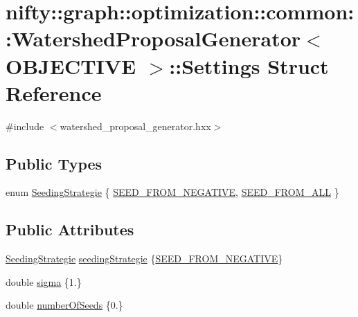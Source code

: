 \hypertarget{structnifty_1_1graph_1_1optimization_1_1common_1_1WatershedProposalGenerator_1_1Settings}{}\section{nifty\+:\+:graph\+:\+:optimization\+:\+:common\+:\+:Watershed\+Proposal\+Generator$<$ O\+B\+J\+E\+C\+T\+I\+V\+E $>$\+:\+:Settings Struct Reference}
\label{structnifty_1_1graph_1_1optimization_1_1common_1_1WatershedProposalGenerator_1_1Settings}


{\ttfamily \#include $<$watershed\+\_\+proposal\+\_\+generator.\+hxx$>$}

\subsection*{Public Types}
\begin{DoxyCompactItemize}
\item 
enum \hyperlink{structnifty_1_1graph_1_1optimization_1_1common_1_1WatershedProposalGenerator_1_1Settings_ac23797b007dcba802d2de1f5219eb4fa}{Seeding\+Strategie} \{ \hyperlink{structnifty_1_1graph_1_1optimization_1_1common_1_1WatershedProposalGenerator_1_1Settings_ac23797b007dcba802d2de1f5219eb4faace3f2f98878e7603a3ee96c8f5545149}{S\+E\+E\+D\+\_\+\+F\+R\+O\+M\+\_\+\+N\+E\+G\+A\+T\+I\+V\+E}, 
\hyperlink{structnifty_1_1graph_1_1optimization_1_1common_1_1WatershedProposalGenerator_1_1Settings_ac23797b007dcba802d2de1f5219eb4faab98c24bd25c4635bfa7aa0b19c3a401e}{S\+E\+E\+D\+\_\+\+F\+R\+O\+M\+\_\+\+A\+L\+L}
 \}
\end{DoxyCompactItemize}
\subsection*{Public Attributes}
\begin{DoxyCompactItemize}
\item 
\hyperlink{structnifty_1_1graph_1_1optimization_1_1common_1_1WatershedProposalGenerator_1_1Settings_ac23797b007dcba802d2de1f5219eb4fa}{Seeding\+Strategie} \hyperlink{structnifty_1_1graph_1_1optimization_1_1common_1_1WatershedProposalGenerator_1_1Settings_a9c4db55b498ef7326e415fbfadefd8d6}{seeding\+Strategie} \{\hyperlink{structnifty_1_1graph_1_1optimization_1_1common_1_1WatershedProposalGenerator_1_1Settings_ac23797b007dcba802d2de1f5219eb4faace3f2f98878e7603a3ee96c8f5545149}{S\+E\+E\+D\+\_\+\+F\+R\+O\+M\+\_\+\+N\+E\+G\+A\+T\+I\+V\+E}\}
\item 
double \hyperlink{structnifty_1_1graph_1_1optimization_1_1common_1_1WatershedProposalGenerator_1_1Settings_a979e41cf56d9e77b041418a432ec3a98}{sigma} \{1.\}
\item 
double \hyperlink{structnifty_1_1graph_1_1optimization_1_1common_1_1WatershedProposalGenerator_1_1Settings_acfa710008cb4cfcfbdae26c9975fc41c}{number\+Of\+Seeds} \{0.\}
\end{DoxyCompactItemize}


